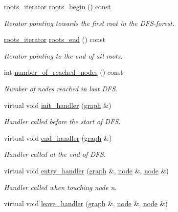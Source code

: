 \begin{DoxyCompactItemize}
\mbox{\hyperlink{classdfs_a1ea6e8eb2766ac95ac48a8523359065a}{roots\+\_\+iterator}} \mbox{\hyperlink{classdfs_af56fa2b736f0b924dba1257e18ba4b61}{roots\+\_\+begin}} () const
\begin{DoxyCompactList}\small\item\em Iterator pointing towards the first root in the D\+F\+S-\/forest. \end{DoxyCompactList}\item 
\mbox{\hyperlink{classdfs_a1ea6e8eb2766ac95ac48a8523359065a}{roots\+\_\+iterator}} \mbox{\hyperlink{classdfs_ae1a61d8c2d8d99059cab410f766ec73f}{roots\+\_\+end}} () const
\begin{DoxyCompactList}\small\item\em Iterator pointing to the end of all roots. \end{DoxyCompactList}\item 
int \mbox{\hyperlink{classdfs_ae8849a552721ad4af5d9a81c6da35822}{number\+\_\+of\+\_\+reached\+\_\+nodes}} () const
\begin{DoxyCompactList}\small\item\em Number of nodes reached in last D\+FS. \end{DoxyCompactList}\item 
virtual void \mbox{\hyperlink{classdfs_aae46a50d0c73c63bf72e483668fd22a2}{init\+\_\+handler}} (\mbox{\hyperlink{classgraph}{graph}} \&)
\begin{DoxyCompactList}\small\item\em Handler called before the start of D\+FS. \end{DoxyCompactList}\item 
virtual void \mbox{\hyperlink{classdfs_a59c512fa99ad3809db3e24347ab43b85}{end\+\_\+handler}} (\mbox{\hyperlink{classgraph}{graph}} \&)
\begin{DoxyCompactList}\small\item\em Handler called at the end of D\+FS. \end{DoxyCompactList}\item 
virtual void \mbox{\hyperlink{classdfs_a6473b0a5d792d9e45c3d32dfdc5b5ffc}{entry\+\_\+handler}} (\mbox{\hyperlink{classgraph}{graph}} \&, \mbox{\hyperlink{classnode}{node}} \&, \mbox{\hyperlink{classnode}{node}} \&)
\begin{DoxyCompactList}\small\item\em Handler called when touching node {\itshape n}. \end{DoxyCompactList}\item 
virtual void \mbox{\hyperlink{classdfs_abfe33292cd567f22596ba0c313481582}{leave\+\_\+handler}} (\mbox{\hyperlink{classgraph}{graph}} \&, \mbox{\hyperlink{classnode}{node}} \&, \mbox{\hyperlink{classnode}{node}} \&)

\end{DoxyCompactItemize}
